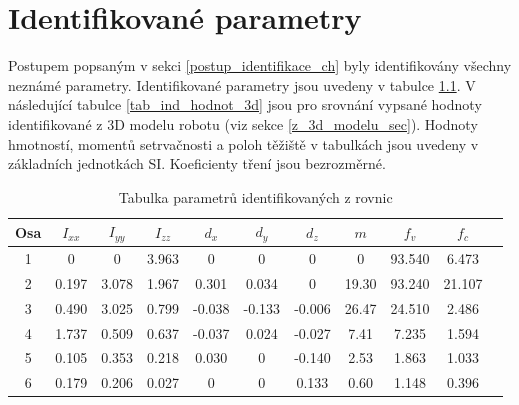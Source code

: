 

\chapter{Identifikované parametry}
\label{identifikovane_parametry_ch}
Postupem popsaným v sekci \ref{postup_identifikace_ch} byly identifikovány všechny neznámé parametry. Identifikované parametry jsou uvedeny v tabulce \ref{tab_ind_hodnot}. V následující tabulce \ref{tab_ind_hodnot_3d} jsou pro srovnání vypsané hodnoty identifikované z 3D modelu robotu (viz sekce \ref{z_3d_modelu_sec}). Hodnoty hmotností, momentů setrvačnosti a poloh těžiště v tabulkách jsou uvedeny v základních jednotkách SI. Koeficienty tření jsou bezrozměrné.
\\
\begin{table}[htbp]
  \centering
  \caption{Tabulka parametrů identifikovaných z rovnic}
    \begin{tabular}{c|cccccccccc}
    \multicolumn{1}{c|}{Osa} & \multicolumn{1}{c}{$I_{xx}$} & \multicolumn{1}{c}{$I_{yy}$} & \multicolumn{1}{c}{$I_{zz}$} & \multicolumn{1}{c}{$d_x$} & \multicolumn{1}{c}{$d_y$} & \multicolumn{1}{c}{$d_z$} & \multicolumn{1}{c}{$m$} & \multicolumn{1}{c}{$f_v$} & \multicolumn{1}{c}{$f_c$} \\
    \hline
    1  & 0     & 0     & 3.963 & 0     & 0     & 0     & 0     & 93.540 &  6.473 \\
    2  & 0.197 & 3.078 & 1.967 & 0.301 & 0.034 & 0     & 19.30 & 93.240 & 21.107 \\
    3  & 0.490 & 3.025 & 0.799 &-0.038 &-0.133 &-0.006 & 26.47 & 24.510 &  2.486 \\
    4  & 1.737 & 0.509 & 0.637 &-0.037 & 0.024 &-0.027 & 7.41  &  7.235 &  1.594 \\
    5  & 0.105 & 0.353 & 0.218 & 0.030 & 0     &-0.140 & 2.53  &  1.863 &  1.033 \\
    6  & 0.179 & 0.206 & 0.027 & 0     & 0     & 0.133 & 0.60  &  1.148 &  0.396 \\
    \end{tabular}%
  \label{tab_ind_hodnot}%
\end{table}%

